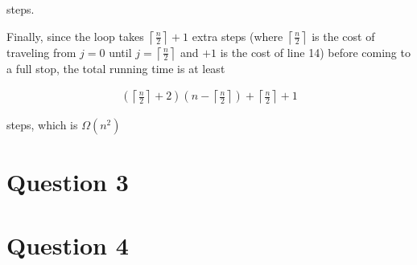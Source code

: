 \documentclass[12pt]{article}
\begin{document}
\begin{enumerate}[a.]
\begin{mdframed}
        steps.

        \bigskip

        \color{red}Finally, since the loop takes $\left\lceil \frac{n}{2} \right\rceil + 1$
        extra steps (where $\left\lceil \frac{n}{2} \right\rceil$ is the cost of traveling
        from $j = 0$ until $j = \left\lceil \frac{n}{2} \right\rceil$ and $+1$ is the
        cost of line 14) before coming to a full stop, the total running time
        is at least

        \begin{align}
            \left(\left\lceil \frac{n}{2} \right\rceil + 2 \right)\left( n - \left\lceil \frac{n}{2} \right\rceil \right) + \left\lceil \frac{n}{2} \right\rceil + 1
        \end{align}

        steps, which is $\Omega(n^2)$

    \end{mdframed}

\end{enumerate}

\section*{Question 3}

\section*{Question 4}
\end{document}
